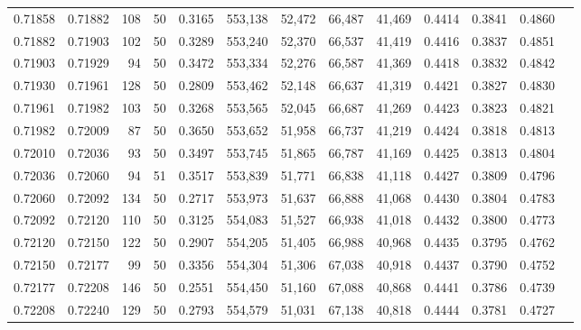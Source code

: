 \begin{tabular}{rrrrrrrrrrrrr}
0.71858 & 0.71882 &   108 &  50 &                                     0.3165 & 553,138 &  52,472 &  66,487 &  41,469 & 0.4414 & 0.3841 & 0.4860 \\
0.71882 & 0.71903 &   102 &  50 &                                     0.3289 & 553,240 &  52,370 &  66,537 &  41,419 & 0.4416 & 0.3837 & 0.4851 \\
0.71903 & 0.71929 &    94 &  50 &                                     0.3472 & 553,334 &  52,276 &  66,587 &  41,369 & 0.4418 & 0.3832 & 0.4842 \\
0.71930 & 0.71961 &   128 &  50 &                                     0.2809 & 553,462 &  52,148 &  66,637 &  41,319 & 0.4421 & 0.3827 & 0.4830 \\
0.71961 & 0.71982 &   103 &  50 &                                     0.3268 & 553,565 &  52,045 &  66,687 &  41,269 & 0.4423 & 0.3823 & 0.4821 \\
0.71982 & 0.72009 &    87 &  50 &                                     0.3650 & 553,652 &  51,958 &  66,737 &  41,219 & 0.4424 & 0.3818 & 0.4813 \\
0.72010 & 0.72036 &    93 &  50 &                                     0.3497 & 553,745 &  51,865 &  66,787 &  41,169 & 0.4425 & 0.3813 & 0.4804 \\
0.72036 & 0.72060 &    94 &  51 &                                     0.3517 & 553,839 &  51,771 &  66,838 &  41,118 & 0.4427 & 0.3809 & 0.4796 \\
0.72060 & 0.72092 &   134 &  50 &                                     0.2717 & 553,973 &  51,637 &  66,888 &  41,068 & 0.4430 & 0.3804 & 0.4783 \\
0.72092 & 0.72120 &   110 &  50 &                                     0.3125 & 554,083 &  51,527 &  66,938 &  41,018 & 0.4432 & 0.3800 & 0.4773 \\
0.72120 & 0.72150 &   122 &  50 &                                     0.2907 & 554,205 &  51,405 &  66,988 &  40,968 & 0.4435 & 0.3795 & 0.4762 \\
0.72150 & 0.72177 &    99 &  50 &                                     0.3356 & 554,304 &  51,306 &  67,038 &  40,918 & 0.4437 & 0.3790 & 0.4752 \\
0.72177 & 0.72208 &   146 &  50 &                                     0.2551 & 554,450 &  51,160 &  67,088 &  40,868 & 0.4441 & 0.3786 & 0.4739 \\
0.72208 & 0.72240 &   129 &  50 &                                     0.2793 & 554,579 &  51,031 &  67,138 &  40,818 & 0.4444 & 0.3781 & 0.4727 \\

\end{tabular}
